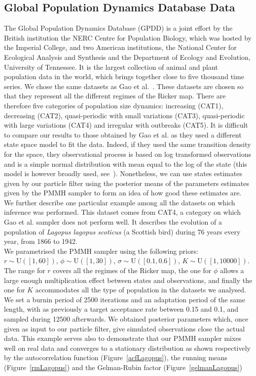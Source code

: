 \documentclass[12pt]{article}
\begin{document}
	\subsection{Global Population Dynamics Database Data}
	The Global Population Dynamics Database (GPDD) is a joint effort by the British institution the NERC Centre for Population Biology, which was hosted by the Imperial College, and two American institutions, the National Center for Ecological Analysis and Synthesis and the Department of Ecology and Evolution, University of Tennessee. It is the largest collection of animal and plant population data in the world, which brings together close to five thousand time series. We chose the same datasets as Gao et al.~\cite{gao2012bayesian}. These datasets are chosen so that they represent all the different regimes of the Ricker map. There are therefore five categories of population size dynamics: increasing (CAT1), decreasing (CAT2), quasi-periodic with small variations (CAT3), quasi-periodic with large variations (CAT4) and irregular with outbreaks (CAT5). It is difficult to compare our results to those obtained by Gao et al. as they used a different state space model to fit the data. Indeed, if they used the same transition density for the space, they observational process is based on log transformed observations and is a simple normal distribution with mean equal to the log of the state (this model is however broadly used, see~\cite{de2002fitting, peters2010ecological, valpine2005state}). Nonetheless, we can use states estimates given by our particle filter using the posterior means of the parameters estimates given by the PMMH sampler to form an idea of how good these estimates are. \\
	
	We further describe one particular example among all the datasets on which inference was performed. This dataset comes from CAT4, a category on which Gao et al. sampler does not perform well. It describes the evolution of a population of \emph{Lagopus lagopus scoticus} (a Scottish bird) during 76 years every year, from 1866 to 1942. \\
	We parametrised the PMMH sampler using the following priors: $r \sim \mathrm{U}([1, 60])$, $\phi \sim \mathrm{U}([1, 30])$, $\sigma \sim \mathrm{U}([0.1, 0.6])$, $K \sim \mathrm{U}([1, 10000])$. The range for $r$ covers all the regimes of the Ricker map, the one for $\phi$ allows a large enough multiplication effect between states and observations, and finally the one for $K$ accommodates all the type of population in the datasets we analysed. We set a burnin period of 2500 iterations and an adaptation period of the same length, with as previously a target acceptance rate between 0.15 and 0.1, and sampled during 12500 afterwards. We obtained posterior parameters which, once given as input to our particle filter, give simulated observations close the actual data. This example serves also to demonstrate that our PMMH sampler mixes well on real data and converges to a stationary distribution as shown respectively by the autocorrelation function (Figure~\ref{acfLagopus}), the running means (Figure~\ref{rmLagopus}) and the Gelman-Rubin factor (Figure~\ref{gelmanLagopus})
	
\end{document}
